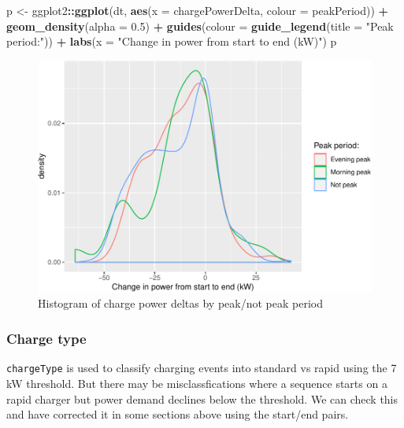 \documentclass[]{article}
\newenvironment{Shaded}{\begin{snugshade}}{\end{snugshade}}
\newcommand{\DataTypeTok}[1]{\textcolor[rgb]{0.13,0.29,0.53}{#1}}
\newcommand{\FloatTok}[1]{\textcolor[rgb]{0.00,0.00,0.81}{#1}}
\newcommand{\KeywordTok}[1]{\textcolor[rgb]{0.13,0.29,0.53}{\textbf{#1}}}
\newcommand{\NormalTok}[1]{#1}
\newcommand{\OperatorTok}[1]{\textcolor[rgb]{0.81,0.36,0.00}{\textbf{#1}}}
\newcommand{\StringTok}[1]{\textcolor[rgb]{0.31,0.60,0.02}{#1}}
\begin{document}
\begin{Shaded}
\begin{Highlighting}[]
\NormalTok{p <-}\StringTok{ }\NormalTok{ggplot2}\OperatorTok{::}\KeywordTok{ggplot}\NormalTok{(dt, }\KeywordTok{aes}\NormalTok{(}\DataTypeTok{x =}\NormalTok{ chargePowerDelta, }\DataTypeTok{colour =}\NormalTok{ peakPeriod)) }\OperatorTok{+}
\StringTok{  }\KeywordTok{geom_density}\NormalTok{(}\DataTypeTok{alpha =} \FloatTok{0.5}\NormalTok{) }\OperatorTok{+}
\StringTok{  }\KeywordTok{guides}\NormalTok{(}\DataTypeTok{colour =} \KeywordTok{guide_legend}\NormalTok{(}\DataTypeTok{title =} \StringTok{"Peak period:"}\NormalTok{)) }\OperatorTok{+}
\StringTok{  }\KeywordTok{labs}\NormalTok{(}\DataTypeTok{x =} \StringTok{"Change in power from start to end (kW)"}\NormalTok{)}
\NormalTok{p}
\end{Highlighting}
\end{Shaded}

\begin{figure}
\centering
\includegraphics{EVBB_report_v1_files/figure-latex/RapidPowerDeltaDensity-1.pdf}
\caption{\label{fig:RapidPowerDeltaDensity}Histogram of charge power deltas by peak/not peak period}
\end{figure}

\hypertarget{charge-type}{%
\subsubsection{Charge type}\label{charge-type}}

\texttt{chargeType} is used to classify charging events into standard vs rapid using the 7 kW threshold. But there may be misclassfications where a sequence starts on a rapid charger but power demand declines below the threshold. We can check this and have corrected it in some sections above using the start/end pairs.
\end{document}
